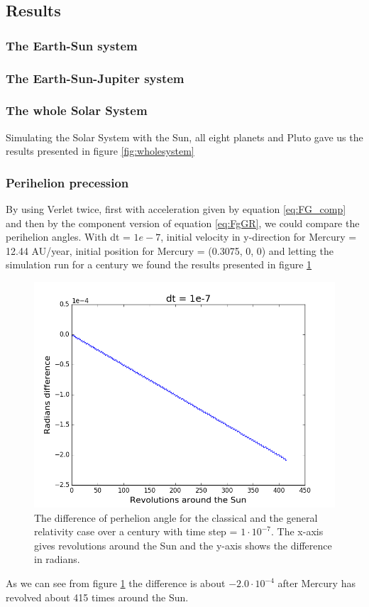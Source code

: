 \documentclass{article}
\newcommand{\E}[1]{\cdot 10^{#1}}
\begin{document}
\subsection{Results}
\subsubsection*{The Earth-Sun system}

\subsubsection*{The Earth-Sun-Jupiter system}
\subsubsection*{The whole Solar System}
Simulating the Solar System with the Sun, all eight planets and Pluto gave us the results presented in figure \ref{fig:wholesystem}
\subsubsection*{Perihelion precession}
By using Verlet twice, first with acceleration given by equation \eqref{eq:FG_comp} and then by the component version of equation \eqref{eq:FgGR}, we could compare the perihelion angles. With dt = $1e-7$, initial velocity in y-direction for Mercury = 12.44 AU/year, initial position for Mercury = (0.3075, 0, 0) and letting the simulation run for a century we found the results presented in figure \ref{fig:perhelion}
\begin{figure}[H]
\centering
\includegraphics[scale=0.5]{../figures/perheliondt1e-7.png}
\caption{The difference of perhelion angle for the classical and the general relativity case over a century with time step = $1\E{-7}$. The x-axis gives revolutions around the Sun and the y-axis shows the difference in radians.}
\label{fig:perhelion}
\end{figure}
As we can see from figure \ref{fig:perhelion} the difference is about $-2.0 \E{-4}$ after Mercury has revolved about 415 times around the Sun. 
\end{document}
